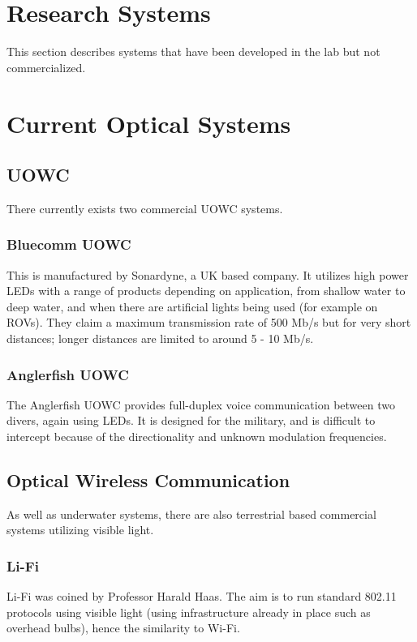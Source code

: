 \documentclass{article}
\begin{document}
\section{Research Systems}
This section describes systems that have been developed in the lab but not commercialized.

\section{Current Optical Systems}
\subsection{\ac{UOWC}}
There currently exists two commercial \ac{UOWC} systems.

\subsubsection{Bluecomm \ac{UOWC}}
This is manufactured by Sonardyne, a UK based company. It utilizes high power \ac{LED}s with a range of products depending on application, from shallow water to deep water, and when there are artificial lights being used (for example on \ac{ROV}s). They claim a maximum transmission rate of 500 Mb/s but for very short distances; longer distances are limited to around 5 - 10 Mb/s.

\subsubsection{Anglerfish \ac{UOWC}}
The Anglerfish \ac{UOWC} provides full-duplex voice communication between two divers, again using \ac{LED}s. It is designed for the military, and is difficult to intercept because of the directionality and unknown modulation frequencies.

\subsection{Optical Wireless Communication}
As well as underwater systems, there are also terrestrial based commercial systems utilizing visible light.

\subsubsection{Li-Fi}
Li-Fi was coined by Professor Harald Haas. The aim is to run standard 802.11 protocols using visible light (using infrastructure already in place such as overhead bulbs), hence the similarity to Wi-Fi.
\end{document}
